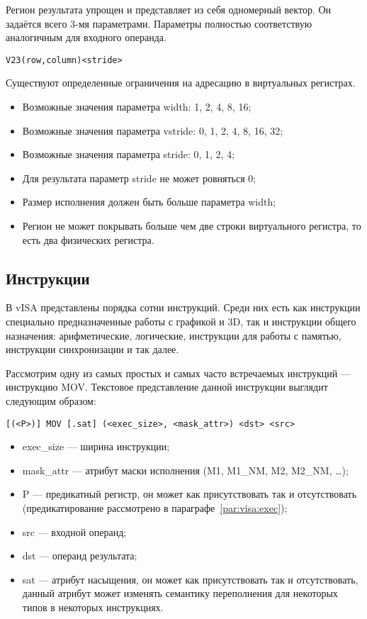 Регион результата упрощен и представляет из себя одномерный вектор.
Он задаётся всего 3-мя параметрами.
Параметры полностью соответствую аналогичным для входного операнда.

\begin{lstlisting}[caption=Пример базового векторного операнда результата, captionpos=b]
    V23(row,column)<stride>
\end{lstlisting}

Существуют определенные ограничения на адресацию в виртуальных регистрах.

\begin{itemize}
    \item Возможные значения параметра width: 1, 2, 4, 8, 16;
    \item Возможные значения параметра vstride: 0, 1, 2, 4, 8, 16, 32;
    \item Возможные значения параметра stride: 0, 1, 2, 4;
    \item Для результата параметр stride не может ровняться 0;
    \item Размер исполнения должен быть больше параметра width;
    \item Регион не может покрывать больше чем две строки виртуального регистра, то есть два физических регистра.
\end{itemize}

\subsection{Инструкции}

В vISA представлены порядка сотни инструкций.
Среди них есть как инструкции специально предназначенные работы с графикой и 3D, так и инструкции общего назначения: арифметические, логические, инструкции для работы с памятью, инструкции синхронизации и так далее.

Рассмотрим одну из самых простых и самых часто встречаемых инструкций --- инструкцию MOV.
Текстовое представление данной инструкции выглядит следующим образом:

\begin{lstlisting}
[(<P>)] MOV [.sat] (<exec_size>, <mask_attr>) <dst> <src>
\end{lstlisting}

\begin{itemize}
    \item exec\_size --- ширина инструкции;
    \item mask\_attr --- атрибут маски исполнения (M1, M1\_NM, M2, M2\_NM, \ldots);
    \item P --- предикатный регистр, он может как присутствовать так и отсутствовать (предикатирование рассмотрено в параграфе~\ref{par:visa:exec});
    \item src --- входной операнд;
    \item dst --- операнд результата;
    \item sat --- атрибут насыщения, он может как присутствовать так и отсутствовать, данный атрибут может изменять семантику переполнения для некоторых типов в некоторых инструкциях.
\end{itemize}

